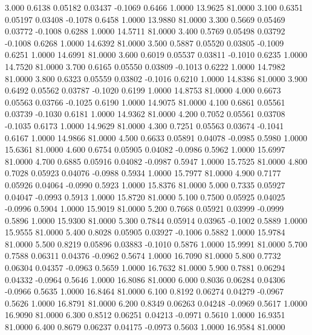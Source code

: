    3.000   0.6138   0.05182   0.03437  -0.1069   0.6466   1.0000  13.9625  81.0000
   3.100   0.6351   0.05197   0.03408  -0.1078   0.6458   1.0000  13.9880  81.0000
   3.300   0.5669   0.05469   0.03772  -0.1008   0.6288   1.0000  14.5711  81.0000
   3.400   0.5769   0.05498   0.03792  -0.1008   0.6268   1.0000  14.6392  81.0000
   3.500   0.5887   0.05520   0.03805  -0.1009   0.6251   1.0000  14.6991  81.0000
   3.600   0.6019   0.05537   0.03811  -0.1010   0.6235   1.0000  14.7520  81.0000
   3.700   0.6165   0.05550   0.03809  -0.1013   0.6222   1.0000  14.7982  81.0000
   3.800   0.6323   0.05559   0.03802  -0.1016   0.6210   1.0000  14.8386  81.0000
   3.900   0.6492   0.05562   0.03787  -0.1020   0.6199   1.0000  14.8753  81.0000
   4.000   0.6673   0.05563   0.03766  -0.1025   0.6190   1.0000  14.9075  81.0000
   4.100   0.6861   0.05561   0.03739  -0.1030   0.6181   1.0000  14.9362  81.0000
   4.200   0.7052   0.05561   0.03708  -0.1035   0.6173   1.0000  14.9629  81.0000
   4.300   0.7251   0.05563   0.03674  -0.1041   0.6167   1.0000  14.9866  81.0000
   4.500   0.6633   0.05891   0.04078  -0.0985   0.5980   1.0000  15.6361  81.0000
   4.600   0.6754   0.05905   0.04082  -0.0986   0.5962   1.0000  15.6997  81.0000
   4.700   0.6885   0.05916   0.04082  -0.0987   0.5947   1.0000  15.7525  81.0000
   4.800   0.7028   0.05923   0.04076  -0.0988   0.5934   1.0000  15.7977  81.0000
   4.900   0.7177   0.05926   0.04064  -0.0990   0.5923   1.0000  15.8376  81.0000
   5.000   0.7335   0.05927   0.04047  -0.0993   0.5913   1.0000  15.8720  81.0000
   5.100   0.7500   0.05925   0.04025  -0.0996   0.5904   1.0000  15.9019  81.0000
   5.200   0.7668   0.05921   0.03999  -0.0999   0.5896   1.0000  15.9300  81.0000
   5.300   0.7844   0.05914   0.03965  -0.1002   0.5889   1.0000  15.9555  81.0000
   5.400   0.8028   0.05905   0.03927  -0.1006   0.5882   1.0000  15.9784  81.0000
   5.500   0.8219   0.05896   0.03883  -0.1010   0.5876   1.0000  15.9991  81.0000
   5.700   0.7588   0.06311   0.04376  -0.0962   0.5674   1.0000  16.7090  81.0000
   5.800   0.7732   0.06304   0.04357  -0.0963   0.5659   1.0000  16.7632  81.0000
   5.900   0.7881   0.06294   0.04332  -0.0964   0.5646   1.0000  16.8086  81.0000
   6.000   0.8036   0.06284   0.04306  -0.0966   0.5635   1.0000  16.8464  81.0000
   6.100   0.8192   0.06274   0.04279  -0.0967   0.5626   1.0000  16.8791  81.0000
   6.200   0.8349   0.06263   0.04248  -0.0969   0.5617   1.0000  16.9090  81.0000
   6.300   0.8512   0.06251   0.04213  -0.0971   0.5610   1.0000  16.9351  81.0000
   6.400   0.8679   0.06237   0.04175  -0.0973   0.5603   1.0000  16.9584  81.0000
